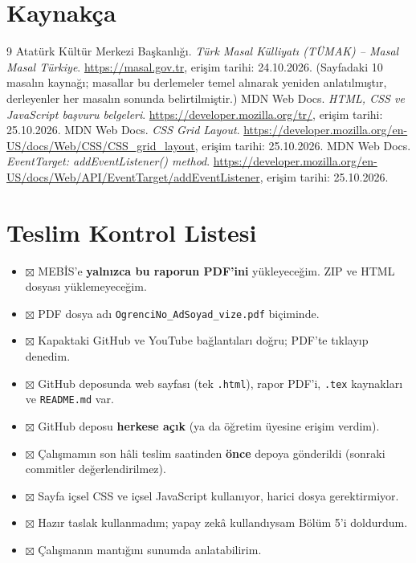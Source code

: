 \documentclass[12pt,a4paper]{article}
\begin{document}
\section{Kaynakça}
\begin{thebibliography}{9}
 Atatürk Kültür Merkezi Başkanlığı. \emph{Türk Masal Külliyatı (TÜMAK) -- Masal Masal Türkiye}. \url{https://masal.gov.tr}, erişim tarihi: 24.10.2026. (Sayfadaki 10 masalın kaynağı; masallar bu derlemeler temel alınarak yeniden anlatılmıştır, derleyenler her masalın sonunda belirtilmiştir.)
 MDN Web Docs. \emph{HTML, CSS ve JavaScript başvuru belgeleri}. \url{https://developer.mozilla.org/tr/}, erişim tarihi: 25.10.2026.
 MDN Web Docs. \emph{CSS Grid Layout}. \url{https://developer.mozilla.org/en-US/docs/Web/CSS/CSS_grid_layout}, erişim tarihi: 25.10.2026.
 MDN Web Docs. \emph{EventTarget: addEventListener() method}. \url{https://developer.mozilla.org/en-US/docs/Web/API/EventTarget/addEventListener}, erişim tarihi: 25.10.2026.
\end{thebibliography}

\appendix
\section{Teslim Kontrol Listesi}
\begin{itemize}[label={}]
  \item $\boxtimes$ MEBİS'e \textbf{yalnızca bu raporun PDF'ini} yükleyeceğim. ZIP ve HTML dosyası yüklemeyeceğim.
  \item $\boxtimes$ PDF dosya adı \texttt{OgrenciNo\_AdSoyad\_vize.pdf} biçiminde.
  \item $\boxtimes$ Kapaktaki GitHub ve YouTube bağlantıları doğru; PDF'te tıklayıp denedim.
  \item $\boxtimes$ GitHub deposunda web sayfası (tek \texttt{.html}), rapor PDF'i, \texttt{.tex} kaynakları ve \texttt{README.md} var.
  \item $\boxtimes$ GitHub deposu \textbf{herkese açık} (ya da öğretim üyesine erişim verdim).
  \item $\boxtimes$ Çalışmamın son hâli teslim saatinden \textbf{önce} depoya gönderildi (sonraki commitler değerlendirilmez).
  \item $\boxtimes$ Sayfa içsel CSS ve içsel JavaScript kullanıyor, harici dosya gerektirmiyor.
  \item $\boxtimes$ Hazır taslak kullanmadım; yapay zekâ kullandıysam Bölüm 5'i doldurdum.
  \item $\boxtimes$ Çalışmanın mantığını sunumda anlatabilirim.
\end{itemize}
\end{document}
